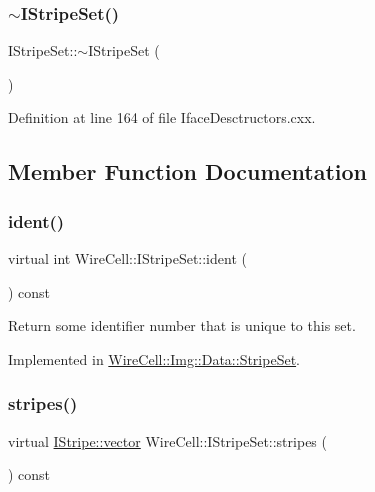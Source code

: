 \subsubsection{\texorpdfstring{$\sim$\+I\+Stripe\+Set()}{~IStripeSet()}}
{\footnotesize\ttfamily I\+Stripe\+Set\+::$\sim$\+I\+Stripe\+Set (\begin{DoxyParamCaption}{ }\end{DoxyParamCaption})\hspace{0.3cm}{\ttfamily [virtual]}}



Definition at line 164 of file Iface\+Desctructors.\+cxx.



\subsection{Member Function Documentation}
\mbox{\label{class_wire_cell_1_1_i_stripe_set_ad0be5e0a3ec55c049289d7a6785d328b}} 
\subsubsection{\texorpdfstring{ident()}{ident()}}
{\footnotesize\ttfamily virtual int Wire\+Cell\+::\+I\+Stripe\+Set\+::ident (\begin{DoxyParamCaption}{ }\end{DoxyParamCaption}) const\hspace{0.3cm}{\ttfamily [pure virtual]}}



Return some identifier number that is unique to this set. 



Implemented in \hyperlink{class_wire_cell_1_1_img_1_1_data_1_1_stripe_set_a93cf81454aa5a3e7e5b89829a8ca44a1}{Wire\+Cell\+::\+Img\+::\+Data\+::\+Stripe\+Set}.

\mbox{\label{class_wire_cell_1_1_i_stripe_set_a45e9d5fa6b0f66a4da105b23ecf214ca}} 
\subsubsection{\texorpdfstring{stripes()}{stripes()}}
{\footnotesize\ttfamily virtual \hyperlink{class_wire_cell_1_1_i_data_ae1a9f863380499bb43f39fabb6276660}{I\+Stripe\+::vector} Wire\+Cell\+::\+I\+Stripe\+Set\+::stripes (\begin{DoxyParamCaption}{ }\end{DoxyParamCaption}) const\hspace{0.3cm}{\ttfamily [pure virtual]}}



